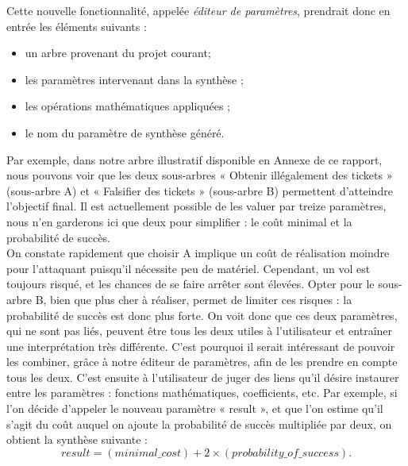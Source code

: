 			Cette nouvelle fonctionnalité, appelée \emph{éditeur de paramètres}, prendrait donc en entrée les éléments suivants :
			\begin{itemize}
				\item un arbre provenant du projet courant; %
				\item les paramètres intervenant dans la synthèse ;
				\item les opérations mathématiques appliquées ;
				\item le nom du paramètre de synthèse généré.
			\end{itemize}

			Par exemple, dans notre arbre illustratif disponible en Annexe de ce rapport, nous pouvons voir que les deux sous-arbres « Obtenir illégalement des tickets » (sous-arbre A) et « Falsifier des tickets » (sous-arbre B) permettent d'atteindre l'objectif final. Il est actuellement possible de les valuer par treize paramètres, nous n'en garderons ici que deux pour simplifier : le coût minimal et la probabilité de succès.\\ %

			On constate rapidement que choisir A implique un coût de réalisation moindre pour l'attaquant puisqu'il nécessite peu de matériel. Cependant, un vol est toujours risqué, et les chances de se faire arrêter sont élevées. Opter pour le sous-arbre B, bien que plus cher à réaliser, permet de limiter ces risques : la probabilité de succès est donc plus forte. On voit donc que ces deux paramètres, qui ne sont pas liés, peuvent être tous les deux utiles à l'utilisateur et entraîner une interprétation très différente. C'est pourquoi il serait intéressant de pouvoir les combiner, grâce à notre éditeur de paramètres, afin de les prendre en compte tous les deux. C'est ensuite à l'utilisateur de juger des liens qu'il désire instaurer entre les paramètres : fonctions mathématiques, coefficients, etc. Par exemple, si l'on décide d'appeler le nouveau paramètre « result », et que l'on estime qu'il s'agit du coût auquel on ajoute la probabilité de succès multipliée par deux, on obtient la synthèse suivante : \[ result = (minimal\_cost) + 2 \times (probability\_of\_success).\]
